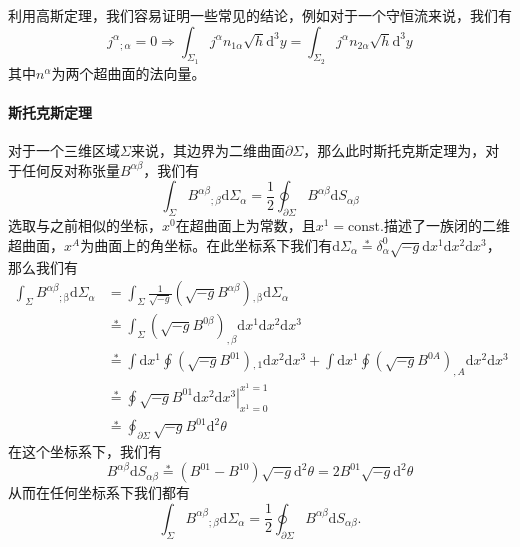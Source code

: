 \documentclass[hyperref, UTF8, a4paper]{ctexart}
\begin{document}
利用高斯定理，我们容易证明一些常见的结论，例如对于一个守恒流来说，我们有
\begin{equation*}
	j^{\alpha }{}_{;\alpha } =0\Rightarrow \int _{\Sigma _{1}} j^{\alpha } n_{1\alpha }\sqrt{h}\mathrm{d}^{3} y=\int _{\Sigma _{2}} j^{\alpha } n_{2\alpha }\sqrt{h}\mathrm{d}^{3} y
\end{equation*}
其中$n^{\alpha }$为两个超曲面的法向量。


\paragraph{斯托克斯定理}

对于一个三维区域$\Sigma $来说，其边界为二维曲面$\partial \Sigma $，那么此时斯托克斯定理为，对于任何反对称张量$B^{\alpha \beta }$，我们有
\begin{equation*}
	\int _{\Sigma } B^{\alpha \beta }{}_{;\beta }\mathrm{d} \Sigma _{\alpha } =\frac{1}{2}\oint _{\partial \Sigma } B^{\alpha \beta }\mathrm{d} S_{\alpha \beta }
\end{equation*}
选取与之前相似的坐标，$x^{0}$在超曲面上为常数，且$x^{1} =\mathrm{const.}$描述了一族闭的二维超曲面，$x^{A}$为曲面上的角坐标。在此坐标系下我们有$\mathrm{d} \Sigma _{\alpha }\stackrel{*}{=} \delta _{\alpha }^{0}\sqrt{-g}\mathrm{d} x^{1}\mathrm{d} x^{2}\mathrm{d} x^{3}$，那么我们有
\begin{equation*}
	\begin{aligned}
		\int _{\Sigma } B^{\alpha \beta }{}\mathrm{_{;\beta } d} \Sigma _{\alpha } & =\int _{\Sigma }\frac{1}{\sqrt{-g}}\left(\sqrt{-g} B^{\alpha \beta }\right)\mathrm{_{,\beta } d} \Sigma _{\alpha }\\
		& \stackrel{*}{=}\int _{\Sigma }\left(\sqrt{-g} B^{0\beta }\right)_{,\beta }\mathrm{d} x^{1}\mathrm{d} x^{2}\mathrm{d} x^{3}\\
		& \stackrel{*}{=}\int \mathrm{d} x^{1}\oint \left(\sqrt{-g} B^{01}\right)\mathrm{_{,1} d} x^{2}\mathrm{d} x^{3} +\int \mathrm{d} x^{1}\oint \left(\sqrt{-g} B^{0A}\right)_{,A}\mathrm{d} x^{2}\mathrm{d} x^{3}\\
		& \left. \stackrel{*}{=}\oint \sqrt{-g} B^{01}\mathrm{d} x^{2}\mathrm{d} x^{3}\right| _{x^{1} =0}^{x^{1} =1}\\
		& \stackrel{*}{=}\oint _{\partial \Sigma }\sqrt{-g} B^{01}\mathrm{d}^{2} \theta 
	\end{aligned}
\end{equation*}
在这个坐标系下，我们有
\begin{equation*}
	B^{\alpha \beta }\mathrm{d} S_{\alpha \beta }\stackrel{*}{=} (B^{01} -B^{10} )\sqrt{-g}\mathrm{d}^{2} \theta =2B^{01}\sqrt{-g}\mathrm{d}^{2} \theta 
\end{equation*}
从而在任何坐标系下我们都有
\begin{equation*}
	\int _{\Sigma } B^{\alpha \beta }{}_{;\beta }\mathrm{d} \Sigma _{\alpha } =\frac{1}{2}\oint _{\partial \Sigma } B^{\alpha \beta }\mathrm{d} S_{\alpha \beta } .
\end{equation*}
\end{document}
